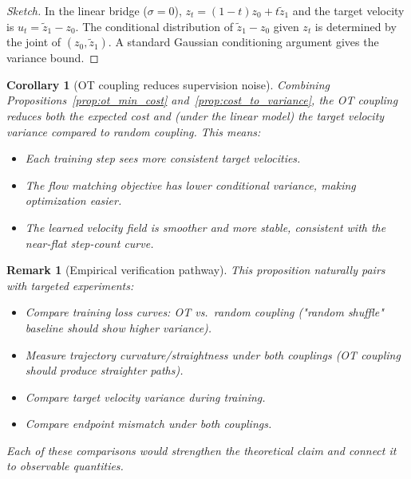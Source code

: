 \documentclass[letterpaper]{article}
\newtheorem{corollary}[proposition]{Corollary}
\newtheorem{remark}[proposition]{Remark}
\begin{document}
\begin{proof}[Sketch]
In the linear bridge ($\sigma=0$), $z_t = (1-t)z_0 + t\tilde z_1$ and the
target velocity is $u_t = \tilde z_1 - z_0$. The conditional distribution
of $\tilde z_1 - z_0$ given $z_t$ is determined by the joint of $(z_0, \tilde z_1)$.
A standard Gaussian conditioning argument gives the variance bound.
\end{proof}

\begin{corollary}[OT coupling reduces supervision noise]
\label{cor:ot_stabilization}
Combining Propositions~\ref{prop:ot_min_cost} and~\ref{prop:cost_to_variance},
the OT coupling reduces both the expected cost and (under the linear model)
the target velocity variance compared to random coupling. This means:
\begin{itemize}
    \item Each training step sees more consistent target velocities.
    \item The flow matching objective has lower conditional variance,
    making optimization easier.
    \item The learned velocity field is smoother and more stable,
    consistent with the near-flat step-count curve.
\end{itemize}
\end{corollary}

\begin{remark}[Empirical verification pathway]
This proposition naturally pairs with targeted experiments:
\begin{itemize}
    \item Compare training loss curves: OT vs.\ random coupling
    ("random shuffle" baseline should show higher variance).
    \item Measure trajectory curvature/straightness under both couplings
    (OT coupling should produce straighter paths).
    \item Compare target velocity variance during training.
    \item Compare endpoint mismatch under both couplings.
\end{itemize}
Each of these comparisons would strengthen the theoretical claim and
connect it to observable quantities.
\end{remark}
\end{document}
